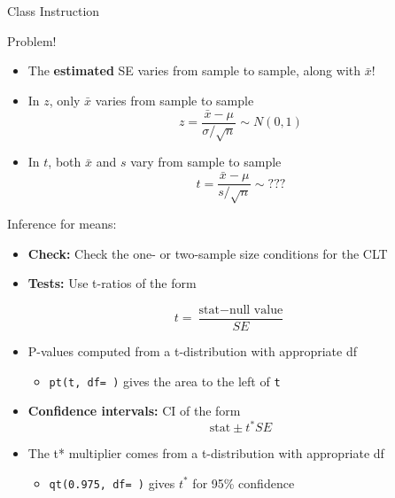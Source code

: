 \documentclass[
  10pt,
  ignorenonframetext,
]{beamer}
\providecommand{\tightlist}{%
  \setlength{\itemsep}{0pt}\setlength{\parskip}{0pt}}
\begin{document}
\begin{frame}{Class Instruction}
\protect\hypertarget{class-instruction}{}
\end{frame}

\begin{frame}{Problem!}
\protect\hypertarget{problem}{}
\begin{itemize}
\item
  The \textbf{estimated} SE varies from sample to sample, along with
  \(\bar{x}\)!
\item
  In \(z\), only \(\bar{x}\) varies from sample to sample
  \[z = \dfrac{\bar{x} - \mu}{\sigma/\sqrt{n}} \sim N(0,1)\]
\item
  In \(t\), both \(\bar{x}\) and \(s\) vary from sample to sample
  \[t = \dfrac{\bar{x} - \mu}{s/\sqrt{n}} \sim ???\]
\end{itemize}
\end{frame}

\begin{frame}[fragile]{Inference for means:}
\protect\hypertarget{inference-for-means}{}
\begin{itemize}
\item
  \textbf{Check:} Check the one- or two-sample size conditions for the
  CLT
\item
  \textbf{Tests:} Use t-ratios of the form
\end{itemize}

\[
t = \dfrac{\textrm{stat} - \textrm{null value}}{SE}
\]

\begin{itemize}
\tightlist
\item
  P-values computed from a t-distribution with appropriate df

  \begin{itemize}
  \tightlist
  \item
    \texttt{pt(t,\ df=\ )} gives the area to the left of \texttt{t}
  \end{itemize}
\item
  \textbf{Confidence intervals:} CI of the form
  \[\textrm{stat} \pm t^* SE\]
\item
  The t* multiplier comes from a t-distribution with appropriate df

  \begin{itemize}
  \tightlist
  \item
    \texttt{qt(0.975,\ df=\ )} gives \(t^*\) for 95\% confidence
  \end{itemize}
\end{itemize}
\end{frame}
\end{document}
